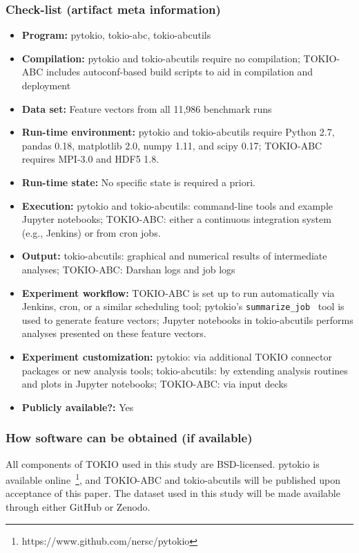 \subsubsection{Check-list (artifact meta information)}

{\small
\begin{itemize}
  \item {\bf Program: } pytokio, tokio-abc, tokio-abcutils
  \item {\bf Compilation: } pytokio and tokio-abcutils require no compilation; TOKIO-ABC includes autoconf-based build scripts to aid in compilation and deployment
  \item {\bf Data set: } Feature vectors from all 11,986 benchmark runs
  \item {\bf Run-time environment: } pytokio and tokio-abcutils require Python 2.7, pandas 0.18, matplotlib 2.0, numpy 1.11, and scipy 0.17; TOKIO-ABC requires MPI-3.0 and HDF5 1.8.
  \item {\bf Run-time state: } No specific state is required a priori.
  \item {\bf Execution: } pytokio and tokio-abcutils: command-line tools and example Jupyter notebooks; TOKIO-ABC: either a continuous integration system (e.g., Jenkins) or from cron jobs.
  \item {\bf Output: } tokio-abcutils: graphical and numerical results of intermediate analyses; TOKIO-ABC: Darshan logs and job logs
  \item {\bf Experiment workflow: } TOKIO-ABC is set up to run automatically via Jenkins, cron, or a similar scheduling tool; pytokio's \texttt{summarize\_job}~\cite{Lockwood2018tokio} tool is used to generate feature vectors; Jupyter notebooks in tokio-abcutils performs analyses presented on these feature vectors.
  \item {\bf Experiment customization: } pytokio: via additional TOKIO connector packages or new analysis tools; tokio-abcutils: by extending analysis routines and plots in Jupyter notebooks; TOKIO-ABC: via input decks
  \item {\bf Publicly available?: } Yes
\end{itemize}
}

\subsubsection{How software can be obtained (if available)}

All components of TOKIO used in this study are BSD-licensed.
pytokio is available online~\footnote{https://www.github.com/nersc/pytokio}, and TOKIO-ABC and tokio-abcutils will be published upon acceptance of this paper.
The dataset used in this study will be made available through either GitHub or Zenodo.

